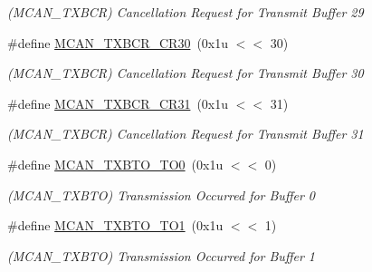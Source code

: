 \begin{DoxyCompactItemize}
\begin{DoxyCompactList}\small\item\em (M\+C\+A\+N\+\_\+\+T\+X\+B\+CR) Cancellation Request for Transmit Buffer 29 \end{DoxyCompactList}\item 
\mbox{\label{group__SAMV71__MCAN_gabd6f619674d31eaab8a68019aeb67b84}} 
\#define \mbox{\hyperlink{group__SAMV71__MCAN_gabd6f619674d31eaab8a68019aeb67b84}{M\+C\+A\+N\+\_\+\+T\+X\+B\+C\+R\+\_\+\+C\+R30}}~(0x1u $<$$<$ 30)
\begin{DoxyCompactList}\small\item\em (M\+C\+A\+N\+\_\+\+T\+X\+B\+CR) Cancellation Request for Transmit Buffer 30 \end{DoxyCompactList}\item 
\mbox{\label{group__SAMV71__MCAN_gae14b76707395d93f06cb0663b83dcd28}} 
\#define \mbox{\hyperlink{group__SAMV71__MCAN_gae14b76707395d93f06cb0663b83dcd28}{M\+C\+A\+N\+\_\+\+T\+X\+B\+C\+R\+\_\+\+C\+R31}}~(0x1u $<$$<$ 31)
\begin{DoxyCompactList}\small\item\em (M\+C\+A\+N\+\_\+\+T\+X\+B\+CR) Cancellation Request for Transmit Buffer 31 \end{DoxyCompactList}\item 
\mbox{\label{group__SAMV71__MCAN_ga20b8b2e54eb7165c3f0ba511af7a11c5}} 
\#define \mbox{\hyperlink{group__SAMV71__MCAN_ga20b8b2e54eb7165c3f0ba511af7a11c5}{M\+C\+A\+N\+\_\+\+T\+X\+B\+T\+O\+\_\+\+T\+O0}}~(0x1u $<$$<$ 0)
\begin{DoxyCompactList}\small\item\em (M\+C\+A\+N\+\_\+\+T\+X\+B\+TO) Transmission Occurred for Buffer 0 \end{DoxyCompactList}\item 
\mbox{\label{group__SAMV71__MCAN_ga2ce2f89808b432179278fccb661b1c87}} 
\#define \mbox{\hyperlink{group__SAMV71__MCAN_ga2ce2f89808b432179278fccb661b1c87}{M\+C\+A\+N\+\_\+\+T\+X\+B\+T\+O\+\_\+\+T\+O1}}~(0x1u $<$$<$ 1)
\begin{DoxyCompactList}\small\item\em (M\+C\+A\+N\+\_\+\+T\+X\+B\+TO) Transmission Occurred for Buffer 1 \end{DoxyCompactList}\item 

\end{DoxyCompactItemize}
